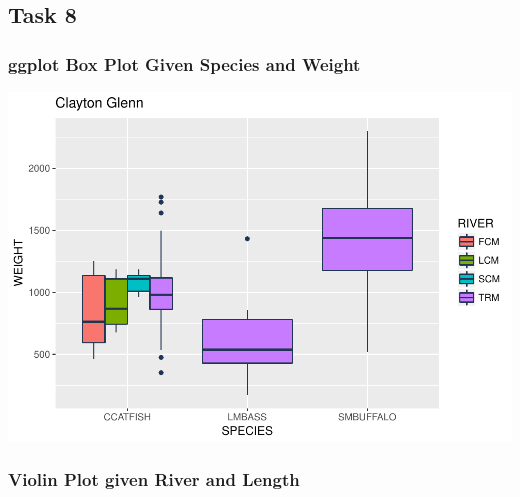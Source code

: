 \documentclass[]{article}
\newenvironment{Shaded}{\begin{snugshade}}{\end{snugshade}}
\newcommand{\KeywordTok}[1]{\textcolor[rgb]{0.13,0.29,0.53}{\textbf{#1}}}
\newcommand{\DataTypeTok}[1]{\textcolor[rgb]{0.13,0.29,0.53}{#1}}
\newcommand{\StringTok}[1]{\textcolor[rgb]{0.31,0.60,0.02}{#1}}
\newcommand{\OperatorTok}[1]{\textcolor[rgb]{0.81,0.36,0.00}{\textbf{#1}}}
\newcommand{\NormalTok}[1]{#1}
\begin{document}
\subsection{Task 8}\label{task-8}

\subsubsection{ggplot Box Plot Given Species and
Weight}\label{ggplot-box-plot-given-species-and-weight}

\begin{Shaded}
\end{Shaded}

\includegraphics{./tex2pdf.5760/7f280a6f19e6eb9732ac2d61b6147b54b58bbb88.pdf}

\subsubsection{Violin Plot given River and
Length}\label{violin-plot-given-river-and-length}
\end{document}
